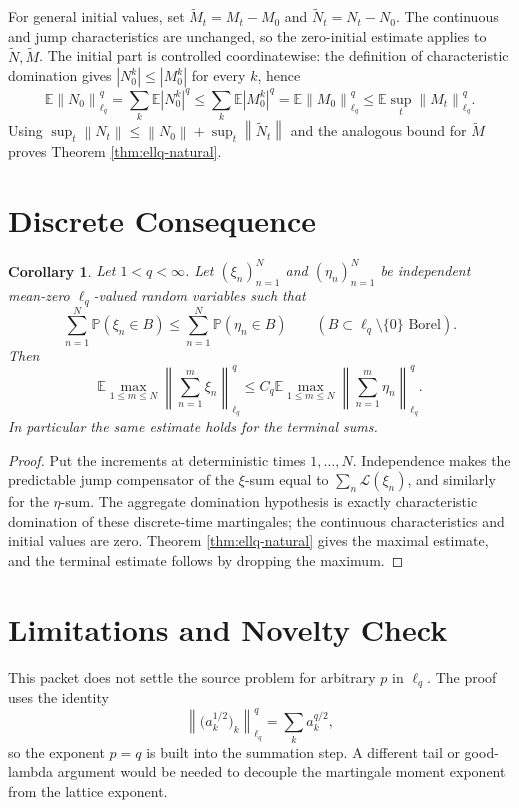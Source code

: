 \documentclass[11pt]{article}
\newtheorem{corollary}{Corollary}
\newcommand{\E}{\mathbb E}
\newcommand{\norm}[1]{\left\lVert #1\right\rVert}
\begin{document}
For general initial values, set \(\widetilde M_t=M_t-M_0\) and
\(\widetilde N_t=N_t-N_0\).  The continuous and jump characteristics are
unchanged, so the zero-initial estimate applies to
\(\widetilde N,\widetilde M\).  The initial part is controlled coordinatewise:
the definition of characteristic domination gives
\(|N_0^k|\leq |M_0^k|\) for every \(k\), hence
\[
   \E\norm{N_0}_{\ell_q}^q
   =
   \sum_k\E |N_0^k|^q
   \leq
   \sum_k\E |M_0^k|^q
   =
   \E\norm{M_0}_{\ell_q}^q
   \leq
   \E\sup_t\norm{M_t}_{\ell_q}^q .
\]
Using \(\sup_t\norm{N_t}\leq \norm{N_0}+\sup_t\norm{\widetilde N_t}\) and the
analogous bound for \(\widetilde M\) proves Theorem
\ref{thm:ellq-natural}.

\section*{Discrete Consequence}

\begin{corollary}
Let \(1<q<\infty\).  Let \((\xi_n)_{n=1}^N\) and
\((\eta_n)_{n=1}^N\) be independent mean-zero \(\ell_q\)-valued random
variables such that
\[
   \sum_{n=1}^N \mathbb P(\xi_n\in B)
   \leq
   \sum_{n=1}^N \mathbb P(\eta_n\in B)
   \qquad
   (B\subset\ell_q\setminus\{0\}\text{ Borel}).
\]
Then
\[
   \E\max_{1\leq m\leq N}
   \norm{\sum_{n=1}^m\xi_n}_{\ell_q}^q
   \leq
   C_q
   \E\max_{1\leq m\leq N}
   \norm{\sum_{n=1}^m\eta_n}_{\ell_q}^q .
\]
In particular the same estimate holds for the terminal sums.
\end{corollary}

\begin{proof}
Put the increments at deterministic times \(1,\ldots,N\).  Independence makes
the predictable jump compensator of the \(\xi\)-sum equal to
\(\sum_n\mathcal L(\xi_n)\), and similarly for the \(\eta\)-sum.  The
aggregate domination hypothesis is exactly characteristic domination of these
discrete-time martingales; the continuous characteristics and initial values
are zero.  Theorem \ref{thm:ellq-natural} gives the maximal estimate, and the
terminal estimate follows by dropping the maximum.
\end{proof}

\section*{Limitations and Novelty Check}

This packet does not settle the source problem for arbitrary \(p\) in
\(\ell_q\).  The proof uses the identity
\[
  \left\|\bigl(a_k^{1/2}\bigr)_k\right\|_{\ell_q}^{q}
  =
  \sum_k a_k^{q/2},
\]
so the exponent \(p=q\) is built into the summation step.  A different tail or
good-lambda argument would be needed to decouple the martingale moment
exponent from the lattice exponent.
\end{document}
